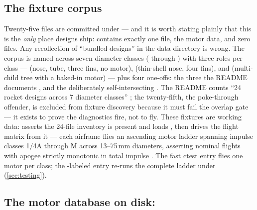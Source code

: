 \subsection{The fixture corpus}\label{sec:persistence-fixtures}

Twenty-five  files are committed under  --- and it
is worth stating plainly that this is the \emph{only} place designs ship: 
contains exactly one file, the  motor data, and zero 
files. Any recollection of ``bundled designs'' in the data directory is wrong. The corpus
is named  across seven diameter classes
( through ) with three roles per class ---  (nose,
tube, three fins, no motor),  (thin-shell nose, four fins), and
 (multi-child tree with a baked-in motor) --- plus four one-offs: the
three the README documents , and the deliberately
self-intersecting 
. The README counts
``24 rocket designs across 7 diameter classes'' ; the
twenty-fifth, the poke-through offender, is excluded from fixture discovery because it
must fail the overlap gate  --- it exists to prove
the diagnostics fire, not to fly. These fixtures are working data:
 asserts the 24-file inventory is present and loads
, then drives the flight matrix from it --- each
 airframe flies an ascending motor ladder spanning impulse classes 1/4A
through M across 13--75\,mm diameters, asserting nominal flights with apogee strictly
monotonic in total impulse . The fast ctest entry
flies one motor per class; the -labeled entry re-runs the complete ladder
under  (\cref{sec:testing}).

\subsection{The motor database on disk: }\label{sec:persistence-qmd}

